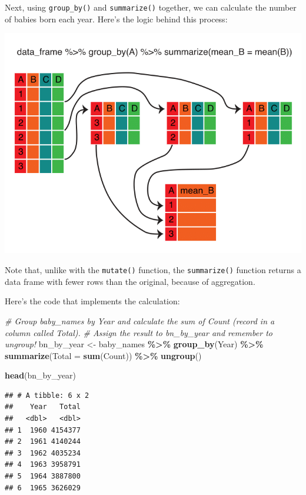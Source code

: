 \documentclass[
]{book}
\newenvironment{Shaded}{\begin{snugshade}}{\end{snugshade}}
\newcommand{\CommentTok}[1]{\textcolor[rgb]{0.56,0.35,0.01}{\textit{#1}}}
\newcommand{\DataTypeTok}[1]{\textcolor[rgb]{0.13,0.29,0.53}{#1}}
\newcommand{\KeywordTok}[1]{\textcolor[rgb]{0.13,0.29,0.53}{\textbf{#1}}}
\newcommand{\NormalTok}[1]{#1}
\newcommand{\OperatorTok}[1]{\textcolor[rgb]{0.81,0.36,0.00}{\textbf{#1}}}
\newcommand{\StringTok}[1]{\textcolor[rgb]{0.31,0.60,0.02}{#1}}
\begin{document}
Next, using \texttt{group\_by()} and \texttt{summarize()} together, we can calculate the number of babies born each year. Here's the logic behind this process:

\includegraphics{R/Rintro/images/summarize_group_by.png}

Note that, unlike with the \texttt{mutate()} function, the \texttt{summarize()} function returns a data frame with fewer rows than the original, because of aggregation.

Here's the code that implements the calculation:

\begin{Shaded}
\begin{Highlighting}[]
\CommentTok{\# Group baby\_names by Year and calculate the sum of Count (record in a column called Total). }
\CommentTok{\# Assign the result to bn\_by\_year and remember to ungroup!}
\NormalTok{bn\_by\_year \textless{}{-}}
\StringTok{  }\NormalTok{baby\_names }\OperatorTok{\%\textgreater{}\%}
\StringTok{  }\KeywordTok{group\_by}\NormalTok{(Year) }\OperatorTok{\%\textgreater{}\%}
\StringTok{  }\KeywordTok{summarize}\NormalTok{(}\DataTypeTok{Total =} \KeywordTok{sum}\NormalTok{(Count)) }\OperatorTok{\%\textgreater{}\%}
\StringTok{  }\KeywordTok{ungroup}\NormalTok{()}

\KeywordTok{head}\NormalTok{(bn\_by\_year)}
\end{Highlighting}
\end{Shaded}

\begin{verbatim}
## # A tibble: 6 x 2
##    Year   Total
##   <dbl>   <dbl>
## 1  1960 4154377
## 2  1961 4140244
## 3  1962 4035234
## 4  1963 3958791
## 5  1964 3887800
## 6  1965 3626029
\end{verbatim}
\end{document}
